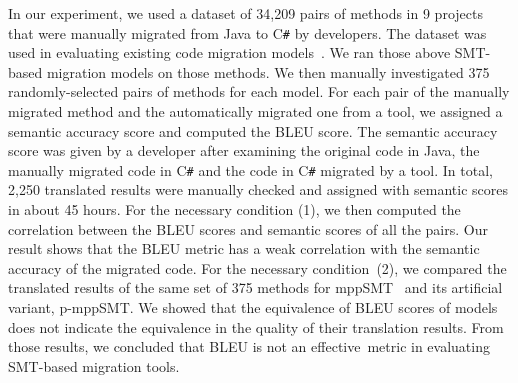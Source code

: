 %

In our experiment, we used a dataset of 34,209 pairs of methods in 9
projects that were manually migrated from Java to C\texttt{\#} by
developers. The dataset was used in evaluating existing code migration
models~\cite{ase15}. We ran those above SMT-based migration models on
those methods. We then manually investigated 375 randomly-selected
pairs of methods for each model. For each pair of the manually
migrated method and the automatically migrated one from a tool, we
assigned a semantic accuracy score and computed the BLEU score. The
semantic accuracy score was given by a developer after examining the
original code in Java, the manually migrated code in C\texttt{\#} and
the code in C\texttt{\#} migrated by a tool. In total, 2,250
translated results were manually checked and assigned with semantic
scores in about 45 hours. For the necessary condition (1), we then
computed the correlation between the BLEU scores and semantic scores
of all the pairs.  Our result shows that the BLEU metric has a weak
correlation with the semantic accuracy of the migrated code. For the
necessary condition~(2), we compared the translated results of the
same set of 375 methods for mppSMT~\cite{ase15} and its artificial
variant, p-mppSMT.
%
We showed that the equivalence of BLEU scores of models does not indicate
the equivalence in the quality of their translation results.
From those results, we concluded that BLEU is not an effective~metric
in evaluating 
SMT-based migration tools.

